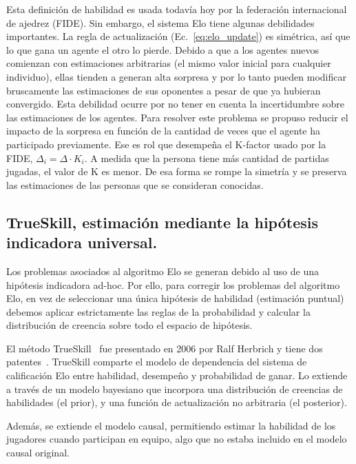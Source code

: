 \documentclass[a4paper,11pt]{book}
\theoremstyle{definition}
\begin{document}
%
Esta definición de habilidad es usada todavía hoy por la federación internacional de ajedrez (FIDE).
%
Sin embargo, el sistema Elo tiene algunas debilidades importantes.
%
La regla de actualización (Ec.~\eqref{eq:elo_update}) es simétrica, así que lo que gana un agente el otro lo pierde.
%
Debido a que a los agentes nuevos comienzan con estimaciones arbitrarias (el mismo valor inicial para cualquier individuo), ellas tienden a generan alta sorpresa y por lo tanto pueden modificar bruscamente las estimaciones de sus oponentes a pesar de que ya hubieran convergido.
%
Esta debilidad ocurre por no tener en cuenta la incertidumbre sobre las estimaciones de los agentes.
%
Para resolver este problema se propuso reducir el impacto de la sorpresa en función de la cantidad de veces que el agente ha participado previamente.
%
Ese es rol que desempe\~na el K-factor usado por la FIDE, $\Delta_i = \Delta \cdot K_i$.
%
A medida que la persona tiene más cantidad de partidas jugadas, el valor de K es menor.
%
De esa forma se rompe la simetría y se preserva las estimaciones de las personas que se consideran conocidas.


\subsection{TrueSkill, estimación mediante la hipótesis indicadora universal.} \label{sec:trueskill}

Los problemas asociados al algoritmo Elo se generan debido al uso de una hipótesis indicadora ad-hoc.
%
Por ello, para corregir los problemas del algoritmo Elo, en vez de seleccionar una única hipótesis de habilidad (estimación puntual) debemos aplicar estrictamente las reglas de la probabilidad y calcular la distribución de creencia sobre todo el espacio de hipótesis.


El método TrueSkill~\cite{Herbrich2007} fue presentado en 2006 por Ralf Herbrich y tiene dos patentes~\cite{trueskill_patent_06, trueskill_patent_09}.
%
TrueSkill comparte el modelo de dependencia del sistema de calificación Elo entre habilidad, desempeño y probabilidad de ganar.
%
Lo extiende a través de un modelo bayesiano que incorpora una distribución de creencias de habilidades (el prior), y una función de actualización no arbitraria (el posterior).


Además, se extiende el modelo causal, permitiendo estimar la habilidad de los jugadores cuando participan en equipo, algo que no estaba incluido en el modelo causal original.
\end{document}
